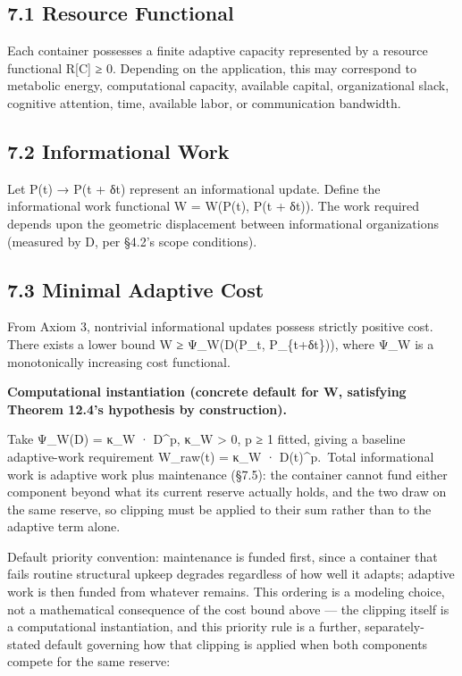 \documentclass[
]{article}
\begin{document}
\hypertarget{resource-functional}{%
\subsection{7.1 Resource Functional}\label{resource-functional}}

Each container possesses a finite adaptive capacity represented by a
resource functional R{[}C{]} ≥ 0. Depending on the application, this may
correspond to metabolic energy, computational capacity, available
capital, organizational slack, cognitive attention, time, available
labor, or communication bandwidth.

\hypertarget{informational-work}{%
\subsection{7.2 Informational Work}\label{informational-work}}

Let P(t) → P(t + δt) represent an informational update. Define the
informational work functional W = W(P(t), P(t + δt)). The work required
depends upon the geometric displacement between informational
organizations (measured by D, per §4.2's scope conditions).

\hypertarget{minimal-adaptive-cost}{%
\subsection{7.3 Minimal Adaptive Cost}\label{minimal-adaptive-cost}}

From Axiom 3, nontrivial informational updates possess strictly positive
cost. There exists a lower bound W ≥ Ψ\_W(D(P\_t, P\_\{t+δt\})), where
Ψ\_W is a monotonically increasing cost functional.

\textbf{Computational instantiation (concrete default for W, satisfying
Theorem 12.4's hypothesis by construction).}

Take Ψ\_W(D) = κ\_W · D\^{}p, κ\_W \textgreater{} 0, p ≥ 1 fitted,
giving a baseline adaptive-work requirement W\_raw(t) = κ\_W ·
D(t)\^{}p.~Total informational work is adaptive work plus maintenance
(§7.5): the container cannot fund either component beyond what its
current reserve actually holds, and the two draw on the same reserve, so
clipping must be applied to their sum rather than to the adaptive term
alone.

Default priority convention: maintenance is funded first, since a
container that fails routine structural upkeep degrades regardless of
how well it adapts; adaptive work is then funded from whatever remains.
This ordering is a modeling choice, not a mathematical consequence of
the cost bound above --- the clipping itself is a computational
instantiation, and this priority rule is a further, separately-stated
default governing how that clipping is applied when both components
compete for the same reserve:
\end{document}
